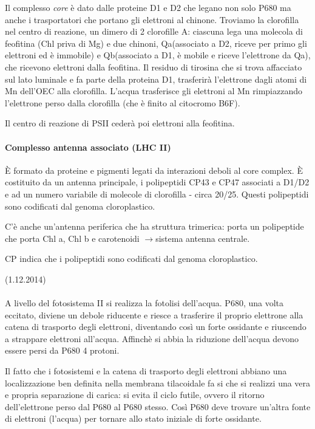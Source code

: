 \documentclass[a4paper,12pt]{book}
\newcommand{\lfreccia}{\ensuremath{\longrightarrow}}
\begin{document}
Il complesso \emph{core} è dato dalle proteine D1 e D2 che legano non solo P680 ma anche i trasportatori che portano gli elettroni al chinone. Troviamo la clorofilla nel centro di reazione, un dimero di 2 clorofille A: ciascuna lega una molecola di feofitina (Chl priva di Mg) e due chinoni, Qa(associato a D2, riceve per primo gli elettroni ed è immobile) e Qb(associato a D1, è mobile e riceve l'elettrone da Qa), che ricevono elettroni dalla feofitina. Il residuo di tirosina che si trova affacciato sul lato luminale e fa parte della proteina D1, trasferirà l'elettrone dagli atomi di Mn dell'OEC alla clorofilla. L'acqua trasferisce gli elettroni al Mn rimpiazzando l'elettrone perso dalla clorofilla (che è finito al citocromo B6F).

Il centro di reazione di PSII cederà poi elettroni alla feofitina.

\paragraph{Complesso antenna associato (LHC II)}
 
È formato da proteine e pigmenti legati da interazioni deboli al core complex.  È costituito da un antenna principale, i polipeptidi CP43 e CP47 associati a D1/D2 e ad un numero variabile di molecole di clorofilla - circa 20/25. Questi polipeptidi sono codificati dal genoma cloroplastico. 

C'è anche un'antenna periferica che ha struttura trimerica: porta un polipeptide che porta Chl a, Chl b e carotenoidi \lfreccia sistema antenna centrale.

CP indica che i polipeptidi sono codificati dal genoma cloroplastico.

(1.12.2014)
\paragraph{}
A livello del fotosistema II si realizza la fotolisi dell'acqua. P680, una volta eccitato, diviene un debole riducente e riesce a trasferire il proprio elettrone alla catena di trasporto degli elettroni, diventando così un forte ossidante e riuscendo a strappare elettroni all'acqua. Affinchè si abbia la riduzione dell'acqua devono essere persi da P680 4 protoni.

Il fatto che i fotosistemi e la catena di trasporto degli elettroni abbiano una localizzazione ben definita nella membrana tilacoidale fa si che si realizzi una vera e propria separazione di carica: si evita il ciclo futile, ovvero il ritorno dell'elettrone perso dal P680 al P680 stesso. Così P680 deve trovare un'altra fonte di elettroni (l'acqua) per tornare allo stato iniziale di forte ossidante. 
\end{document}

